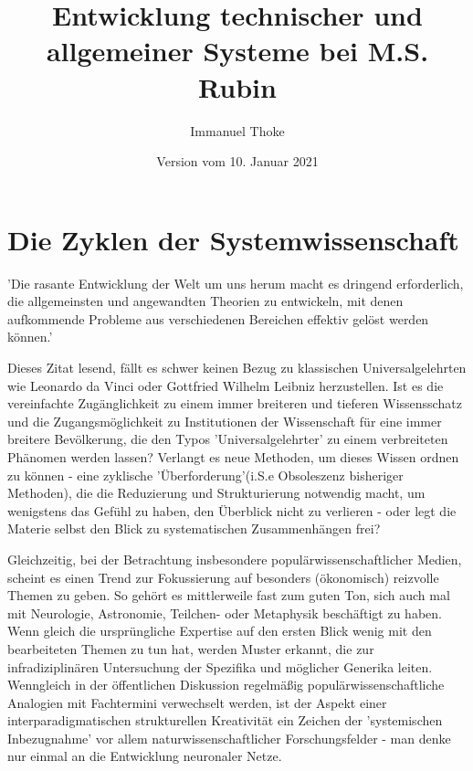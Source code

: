 \documentclass[a4paper,11pt]{article}
\author{Immanuel Thoke}
\title{Entwicklung technischer und allgemeiner Systeme bei M.S. Rubin}
\date{Version vom 10. Januar 2021}
\begin{document}
\maketitle
\section{Die Zyklen der Systemwissenschaft}
'Die rasante Entwicklung der Welt um uns herum macht es dringend erforderlich, die allgemeinsten und angewandten Theorien zu entwickeln,
mit denen aufkommende Probleme aus verschiedenen Bereichen effektiv gelöst werden können.'\cite{Rubin2002}

Dieses Zitat lesend, fällt es schwer keinen Bezug zu klassischen Universalgelehrten wie
Leonardo da Vinci oder Gottfried Wilhelm Leibniz herzustellen.
Ist es die vereinfachte Zugänglichkeit zu einem immer breiteren und tieferen Wissensschatz und
die Zugangsmöglichkeit zu Institutionen der Wissenschaft für eine immer breitere Bevölkerung,
die den Typos 'Universalgelehrter' zu einem verbreiteten Phänomen werden lassen? Verlangt es
neue Methoden, um dieses Wissen ordnen zu können - eine zyklische 'Überforderung'(i.S.e
Obsoleszenz bisheriger Methoden), die die Reduzierung und Strukturierung notwendig macht, um
wenigstens das Gefühl zu haben, den Überblick nicht zu verlieren - oder legt die Materie selbst
den Blick zu systematischen Zusammenhängen frei?

Gleichzeitig, bei der Betrachtung insbesondere populärwissenschaftlicher Medien, scheint es
einen Trend zur Fokussierung auf besonders (ökonomisch) reizvolle Themen zu geben. So gehört es
mittlerweile fast zum guten Ton, sich auch mal mit Neurologie, Astronomie, Teilchen- oder
Metaphysik beschäftigt zu haben. Wenn gleich die ursprüngliche Expertise auf den ersten Blick
wenig mit den bearbeiteten Themen zu tun hat, werden Muster erkannt, die zur infradiziplinären
Untersuchung der Spezifika und möglicher Generika leiten. Wenngleich in der öffentlichen
Diskussion regelmäßig populärwissenschaftliche Analogien mit Fachtermini verwechselt werden,
ist der Aspekt einer interparadigmatischen strukturellen Kreativität ein Zeichen der
'systemischen Inbezugnahme' vor allem naturwissenschaftlicher Forschungsfelder - man denke nur
einmal an die Entwicklung neuronaler Netze. 
\end{document}
